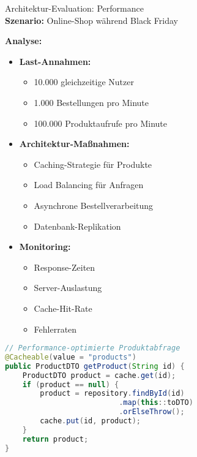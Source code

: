\begin{example2}{Architektur-Evaluation: Performance}\\
\textbf{Szenario:} Online-Shop während Black Friday

\textbf{Analyse:}
\begin{itemize}
    \item \textbf{Last-Annahmen:}
    \begin{itemize}
        \item 10.000 gleichzeitige Nutzer
        \item 1.000 Bestellungen pro Minute
        \item 100.000 Produktaufrufe pro Minute
    \end{itemize}
    
    \item \textbf{Architektur-Maßnahmen:}
    \begin{itemize}
        \item Caching-Strategie für Produkte
        \item Load Balancing für Anfragen
        \item Asynchrone Bestellverarbeitung
        \item Datenbank-Replikation
    \end{itemize}
    
    \item \textbf{Monitoring:}
    \begin{itemize}
        \item Response-Zeiten
        \item Server-Auslastung
        \item Cache-Hit-Rate
        \item Fehlerraten
    \end{itemize}
\end{itemize}

\begin{lstlisting}[language=Java, style=basesmol]
// Performance-optimierte Produktabfrage
@Cacheable(value = "products")
public ProductDTO getProduct(String id) {
    ProductDTO product = cache.get(id);
    if (product == null) {
        product = repository.findById(id)
                          .map(this::toDTO)
                          .orElseThrow();
        cache.put(id, product);
    }
    return product;
}
\end{lstlisting}
\end{example2}




